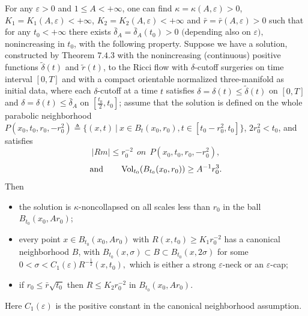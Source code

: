 \begin{theorem}
  \label{thm:cz-bounded-time-surgery-curvature-estimate}

For any $\varepsilon > 0$ and  $1 \leq A<+\infty$, one can find
$\kappa=\kappa(A,\varepsilon)>0$,
$K_1=K_1(A,\varepsilon)<+\infty$, $K_2=K_2(A,\varepsilon)<+\infty$
and $\bar{r}=\bar{r}(A,\varepsilon)>0$ such that for any
$t_0<+\infty$ there exists $\bar{\delta}_A=\bar{\delta}_A(t_0)>0$
$($depending also on $\varepsilon),$ nonincreasing in $t_0$, with
the following property. Suppose we have a solution, constructed by
Theorem $7.4.3$ with the nonincreasing (continuous) positive
functions $\widetilde{\delta}(t)$ and $\widetilde{r}(t)$, to the
Ricci flow with $\delta$-cutoff surgeries on time interval $[0,T]$
and with a compact orientable normalized three-manifold as initial
data, where each $\delta$-cutoff at a time $t$ satisfies
$\delta=\delta(t) \leq \widetilde{\delta}(t)$ on $[0,T]$ and
$\delta=\delta(t) \leq \bar{\delta}_A$ on $[\frac{t_0}{2},t_0]$;
assume that the solution is defined on the whole parabolic
neighborhood $P(x_0,t_0,r_0,-r^2_0)\triangleq\{(x,t)\ |\ x\in
B_t(x_0,r_0),t\in[t_0-r^2_0,t_0]\}$, $2r^2_0<t_0$, and satisfies
$$
|Rm|\leq r^{-2}_0 \ \ on \ \ P(x_0,t_0,r_0,-r^2_0),
$$
$$
\text{and} \qquad \operatorname{Vol}_{t_0}(B_{t_0}(x_0,r_0))\geq A^{-1}r^3_0.
$$
Then
\begin{itemize}
\item[(i)] the solution is $\kappa$-noncollapsed on all scales
less than $r_0$ in the ball $B_{t_0}(x_0,Ar_0)$; \item[(ii)] every
point $x\in B_{t_0}(x_0,Ar_0)$ with $R(x,t_0)\geq K_1r^{-2}_0$ has
a canonical neighborhood $B$, with $ B_{t_0}(x,\sigma)\subset
B\subset B_{t_0}(x,2\sigma)$ for some
$0<\sigma<C_1(\varepsilon)R^{-\frac{1}{2}}(x,t_0), $ which is
either a strong $\varepsilon$-neck or an $\varepsilon$-cap;
\item[(iii)] if $r_0\leq \bar{r}\sqrt{t_0}$ then $R\leq
K_2r^{-2}_0$ in $B_{t_0}(x_0,Ar_0)$.
\end{itemize}
Here $C_1(\varepsilon)$ is the positive constant in the canonical
neighborhood assumption.

\end{theorem}
